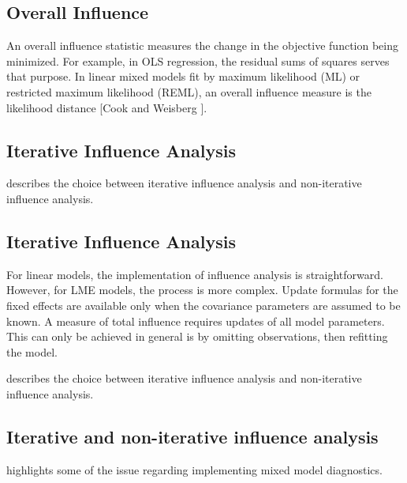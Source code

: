 \documentclass[Main.tex]{subfiles}
\begin{document}
	\subsection{Overall Influence}
	An overall influence statistic measures the change in the objective function being minimized. For example, in
	OLS regression, the residual sums of squares serves that purpose. In linear mixed models fit by
	 maximum likelihood (ML) or  restricted maximum likelihood (REML), an overall influence measure is the  likelihood distance [Cook and Weisberg ].
		
	\subsection{Iterative Influence Analysis}
	
	
	
	\citet{schabenberger} describes the choice between  iterative influence analysis and  non-iterative influence analysis.
		
		
		
				\subsection{Iterative Influence Analysis}
				
				For linear models, the implementation of influence analysis is straightforward.
				However, for LME models, the process is more complex. Update formulas for the fixed effects are available only when the covariance parameters are assumed to be known. A measure of total influence requires updates of all model parameters.
				This can only be achieved in general is by omitting observations, then refitting the model.
				
				\citet{schabenberger} describes the choice between  iterative influence analysis and  non-iterative influence analysis.
				

	

\subsection{Iterative and non-iterative influence analysis} %
\citet{schabenberger} highlights some of the issue regarding implementing mixed model diagnostics.
\end{document}
